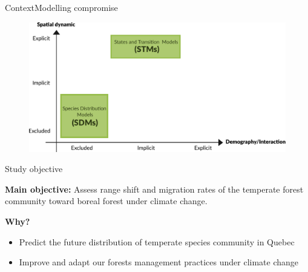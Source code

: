 \documentclass[10pt,aspectratio=149]{beamer}
\begin{document}


\begin{frame}{Context}{Modelling compromise}
		\begin{figure}
			\includegraphics[width=1.2\paperheight]{Figs/schema_models.pdf}
		\end{figure}

\end{frame}





\begin{frame}{Study objective}

\textbf{Main objective:} Assess range shift and migration rates of the temperate forest community toward boreal forest under climate change.

\pause 

\vspace{1em}
\textbf{Why?}
		\begin{itemize}
			\item Predict the future distribution of temperate species community in Quebec
		 	\item Improve and adapt our forests management practices under climate change
		\end{itemize}

\end{frame}
\end{document}
